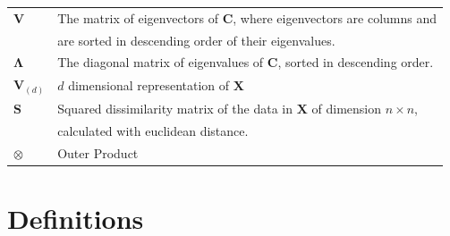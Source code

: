 \documentclass[12pt]{report}
\begin{document}
\begin{table}[ht]
\begin{tabular}{|l|l|}
$\mathbf{V}$    & The matrix of eigenvectors of $\mathbf{C}$, 
where eigenvectors are columns and \\ & are sorted in descending order of their eigenvalues.  \\ \hline
$\mathbf{\Lambda}$    & The diagonal matrix of eigenvalues of $\mathbf{C}$, 
sorted in descending order.        \\ \hline
$\mathbf{V}_{(d)}$ & $d$ dimensional representation of $\mathbf{X}$      \\ \hline
$\mathbf{S}$    & Squared dissimilarity matrix of the data in $\mathbf{X}$ 
of dimension $n \times n$, \\ & calculated with euclidean distance. \\ \hline
$\otimes$    & Outer Product \\ \hline
\end{tabular}
\end{table}

\newpage

\section{Definitions}
\end{document}
